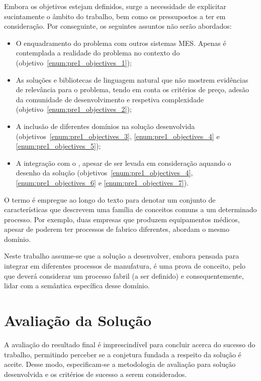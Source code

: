 Embora os objetivos estejam definidos, surge a necessidade de explicitar sucintamente o âmbito do trabalho, bem como os pressupostos a ter em consideração. Por conseguinte, os seguintes assuntos não serão abordados:

\begin{itemize}
    \item
    {
        O enquadramento do problema com outros sistemas \gls{MES}. Apenas é contemplada a realidade do problema no contexto do {\productname} (objetivo~\ref{enum:pre1_objectives_1});
    }
    \item
    {
        As soluções e bibliotecas de linguagem natural que não mostrem evidências de relevância para o problema, tendo em conta os critérios de preço, adesão da comunidade de desenvolvimento e respetiva complexidade (objetivo~\ref{enum:pre1_objectives_2});
    }
    \item 
    {
        A inclusão de diferentes domínios na solução desenvolvida (objetivos~\ref{enum:pre1_objectives_3}, \ref{enum:pre1_objectives_4} e \ref{enum:pre1_objectives_5});
    }
    \item 
    {
        A integração com o {\productname}, apesar de ser levada em consideração aquando o desenho da solução (objetivos~\ref{enum:pre1_objectives_4}, \ref{enum:pre1_objectives_6} e \ref{enum:pre1_objectives_7}).
    }
\end{itemize}

O termo  é empregue ao longo do texto para denotar um conjunto de características que descrevem uma família de conceitos comuns a um determinado processo. Por exemplo, duas empresas que produzem equipamentos médicos, apesar de poderem ter processos de fabrico diferentes, abordam o mesmo domínio.

Neste trabalho assume-se que a solução a desenvolver, embora pensada para integrar em diferentes processos de manufatura, é uma prova de conceito, pelo que deverá considerar um processo fabril (a ser definido) e consequentemente, lidar com a semântica específica desse domínio.

\section{Avaliação da Solução}
\label{sec:pre1_success_criteria}

A avaliação do resultado final é imprescindível para concluir acerca do sucesso do trabalho, permitindo perceber se a conjetura fundada a respeito da solução é aceite. Desse modo, especificam-se a metodologia de avaliação para solução desenvolvida e os critérios de sucesso a serem considerados.


